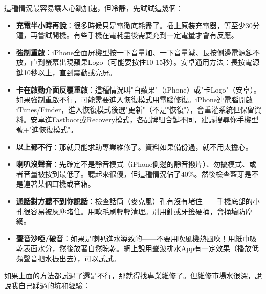
這種情況最容易讓人心跳加速，但冷靜，先試試這幾個：

\begin{itemize}
  \item \textbf{充電半小時再說}：很多時候只是電徹底耗盡了。插上原裝充電器，等至少30分鐘，再嘗試開機。有些手機在電耗盡後需要充到一定電量才會有反應。
  \item \textbf{強制重啟}：iPhone全面屏機型按一下音量加、一下音量減、長按側邊電源鍵不放，直到螢幕出現蘋果Logo（可能要按住10-15秒）。安卓通用方法：長按電源鍵10秒以上，直到震動或亮屏。
  \item \textbf{卡在啟動介面反覆重啟}：這種情況叫"白蘋果"（iPhone）或"卡Logo"（安卓）。如果強制重啟不行，可能需要進入恢復模式用電腦修復。iPhone連電腦開啟iTunes/Finder，進入恢復模式後選"更新"（不是"恢復"），會重灌系統但保留資料。安卓進Fastboot或Recovery模式，各品牌組合鍵不同，建議搜尋你手機型號+"進恢復模式"。
  \item \textbf{以上都不行}：那就只能求助專業維修了。資料如果備份過，就不用太擔心。
\end{itemize}


\begin{itemize}
  \item \textbf{喇叭沒聲音}：先確定不是靜音模式（iPhone側邊的靜音撥片）、勿擾模式、或者音量被按到最低了。聽起來很傻，但這種情況佔了40\%。然後檢查藍芽是不是連著某個耳機或音箱。
  \item \textbf{通話對方聽不到你說話}：檢查話筒（麥克風）孔有沒有堵住——手機底部的小孔很容易被灰塵堵住。用軟毛刷輕輕清理。別用針或牙籤硬捅，會捅壞防塵網。
  \item \textbf{聲音沙啞/破音}：如果是喇叭進水導致的——不要用吹風機熱風吹！用紙巾吸乾表面水分，然後放著自然晾乾。網上說用聲波排水App有一定效果（播放低頻聲音把水振出去），可以試試。
\end{itemize}


如果上面的方法都試過了還是不行，那就得找專業維修了。但維修市場水很深，說說我自己踩過的坑和經驗：

